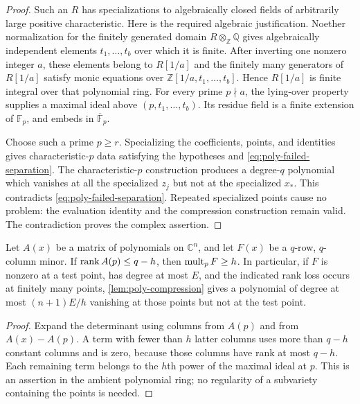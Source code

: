 \begin{proof}
Such an $R$ has specializations to algebraically closed fields of arbitrarily large positive characteristic.  Here is the required algebraic justification.  Noether normalization for the finitely generated domain $R\otimes_{\mathbb{Z}}\mathbb{Q}$ gives algebraically independent elements $t_1,\ldots,t_b$ over which it is finite.  After inverting one nonzero integer $a$, these elements belong to $R[1/a]$ and the finitely many generators of $R[1/a]$ satisfy monic equations over $\mathbb{Z}[1/a,t_1,\ldots,t_b]$.  Hence $R[1/a]$ is finite integral over that polynomial ring.  For every prime $p\nmid a$, the lying-over property supplies a maximal ideal above $(p,t_1,\ldots,t_b)$.  Its residue field is a finite extension of $\mathbb{F}_p$, and embeds in $\overline{\mathbb{F}}_p$.

Choose such a prime $p\ge r$.  Specializing the coefficients, points, and identities gives characteristic-$p$ data satisfying the hypotheses and \eqref{eq:poly-failed-separation}.  The characteristic-$p$ construction produces a degree-$q$ polynomial which vanishes at all the specialized $z_j$ but not at the specialized $x_*$.  This contradicts \eqref{eq:poly-failed-separation}.  Repeated specialized points cause no problem: the evaluation identity and the compression construction remain valid.  The contradiction proves the complex assertion.
\end{proof}

\begin{lemma}
\label{lem:poly-matrix-multiplicity}
Let $A(x)$ be a matrix of polynomials on $\mathbb{C}^n$, and let $F(x)$ be a $q$-row, $q$-column minor.  If $\rank A(p)\le q-h$, then $\operatorname{mult}_pF\ge h$.  In particular, if $F$ is nonzero at a test point, has degree at most $E$, and the indicated rank loss occurs at finitely many points, \cref{lem:poly-compression} gives a polynomial of degree at most $(n+1)E/h$ vanishing at those points but not at the test point.
\end{lemma}

\begin{proof}
Expand the determinant using columns from $A(p)$ and from $A(x)-A(p)$.  A term with fewer than $h$ latter columns uses more than $q-h$ constant columns and is zero, because those columns have rank at most $q-h$.  Each remaining term belongs to the $h$th power of the maximal ideal at $p$.  This is an assertion in the ambient polynomial ring; no regularity of a subvariety containing the points is needed.
\end{proof}

